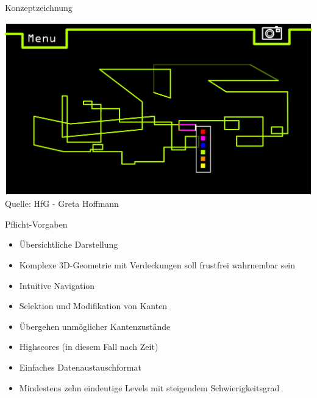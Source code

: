 \documentclass[18pt]{beamer}
\begin{document}
\begin{frame}{Konzeptzeichnung}
\begin{center}
\includegraphics[scale=0.3]{mockup} \\
Quelle: HfG - Greta Hoffmann
\end{center}

\end{frame}
\begin{frame}{Pflicht-Vorgaben}
\begin{itemize}
\item Übersichtliche Darstellung
\item Komplexe 3D-Geometrie mit Verdeckungen soll frustfrei wahrnembar sein
\item Intuitive Navigation
\item Selektion und Modifikation von Kanten
\item Übergehen unmöglicher Kantenzustände
\item Highscores (in diesem Fall nach Zeit)
\item Einfaches Datenaustauschformat
\item Mindestens zehn eindeutige Levels mit steigendem Schwierigkeitsgrad
\end{itemize}
\end{frame}
\end{document}

